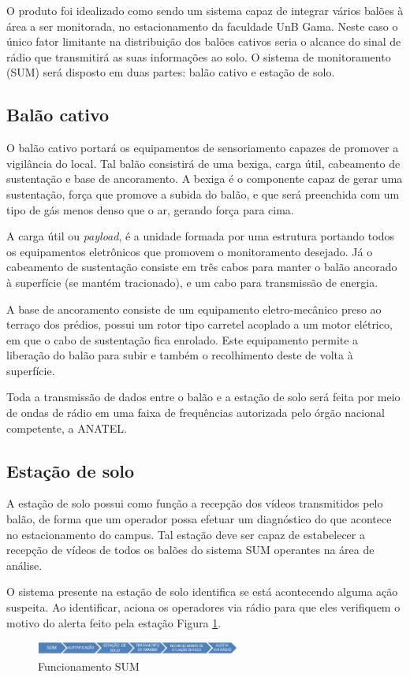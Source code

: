 O produto foi idealizado como sendo um sistema capaz de integrar vários balões à área a ser monitorada,  no estacionamento da faculdade UnB Gama. Neste caso o único fator limitante na distribuição dos balões cativos seria o alcance do sinal de rádio que transmitirá as suas informações ao solo. O sistema de monitoramento (SUM) será disposto em duas partes: balão cativo e estação de solo.

\subsection{Balão cativo}

O balão cativo portará os equipamentos de sensoriamento capazes de promover a vigilância do local. Tal balão  consistirá de uma bexiga, carga útil, cabeamento de sustentação e base de ancoramento. A bexiga é o componente capaz de gerar uma sustentação, força que promove a subida do balão, e que será preenchida com um tipo de gás menos denso que o ar, gerando força para cima.

A carga útil ou \textit{payload}, é a unidade formada por uma estrutura portando todos  os equipamentos eletrônicos que promovem o monitoramento desejado. Já o cabeamento de sustentação consiste em  três cabos para manter o balão ancorado à superfície (se mantém tracionado), e um cabo para  transmissão de energia.

A base de ancoramento consiste de um equipamento eletro-mecânico preso ao terraço dos prédios, possui um rotor tipo carretel acoplado a um motor elétrico, em que o cabo de sustentação fica enrolado. Este equipamento permite a liberação do balão para subir e também o recolhimento deste de volta à superfície.

Toda a transmissão de dados entre o balão e a estação de solo será feita por meio de ondas de rádio em uma faixa de frequências autorizada pelo órgão nacional competente, a ANATEL.

\subsection{Estação de solo}

A estação de solo possui como função a recepção dos vídeos transmitidos pelo balão, de forma que um operador possa efetuar um diagnóstico do que acontece no estacionamento do campus. Tal estação deve ser capaz de estabelecer a recepção de vídeos de todos os balões do sistema SUM operantes na área de análise.

O sistema presente na estação de solo identifica se  está acontecendo alguma ação suspeita. Ao identificar,  aciona os operadores via rádio  para que eles verifiquem o motivo do alerta feito pela estação Figura \ref{img:processo}.


\begin{figure}[H]
	\centering
	\includegraphics[width=0.6\textwidth]{figuras/processo}
	\caption{Funcionamento SUM}
	\label{img:processo}
\end{figure}
